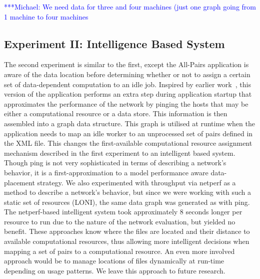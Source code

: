 \documentclass{rspublic}
\newcommand{\micnote}[1]{ {\textcolor{blue} { ***Michael: #1 }}}
\newcommand{\betynote}[1]{ {\textcolor{orange} { ***Bety: #1 }}}
\newcommand{\jhanote}[1]{} \newcommand{\micnote}[1]{}\newcommand{\betynote}[1]{} \newcommand{\fixme}[1]{}
\begin{document}

\jhanote{We need data for compute (comparison) and I/O (only) for
different data-set sizes} \micnote{We need data for three and four
machines (just one graph going from 1 machine to four machines}

\subsection{Experiment II: Intelligence Based System}
The second experiment is similar to the first, except the All-Pairs
application is aware of  the data location before determining whether or
not to assign a certain set of data-dependent computation to an idle
job. Inspired by earlier work~\citep{netperf}, this version of the
application performs an extra step during application startup that
approximates the performance of the network by pinging the hosts that
may be either a computational resource or a data store. This information
is then assembled into a graph data structure. This graph is utilised at
runtime when the application needs to map an idle worker to an
unprocessed set of pairs defined in the XML file. This changes the
first-available computational resource assignment mechanism described in
the first experiment to an intelligent based system. Though ping is not
very sophisticated in terms of describing a network's behavior, it is a
first-approximation to a model performance aware data-placement
strategy.  We also experimented with throughput via netperf
\citep{netperf_web} as a method to describe a network's behavior, but
since we were working with such a static set of resources (LONI), the
same data graph was generated as with ping. The netperf-based
intelligent system took approximately 8 seconds longer per resource to
run due to the nature of the network evaluation, but yielded no benefit.
These approaches know where the files are located and their distance to
available computational resources, thus allowing more intelligent
decisions when mapping a set of pairs to a computational resource. An
even more involved approach would be to manage locations of files
dynamically at run-time depending on usage patterns. We leave this
approach to future research.  
\end{document}
